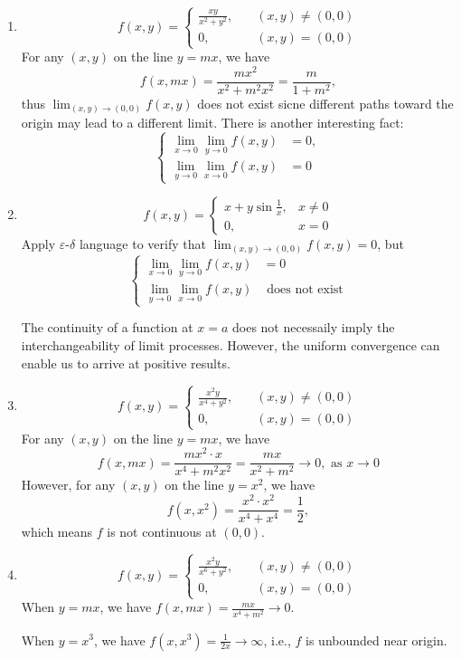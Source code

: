 \begin{example}
\begin{enumerate}
\item
\[
f(x,y)=\left\{
\begin{aligned}
\frac{xy}{x^2+y^2},&\quad (x,y)\ne(0,0)\\
0,&\quad (x,y)=(0,0)
\end{aligned}
\right.
\]
For any $(x,y)$ on the line $y=mx$, we have
\[
f(x,mx)=\frac{mx^2}{x^2+m^2x^2}=\frac{m}{1+m^2},
\]
thus $\lim_{(x,y)\to(0,0)}f(x,y)$ does not exist sicne different paths toward the origin may lead to a different limit. There is another interesting fact:
\[
\left\{
\begin{aligned}
\lim_{x\to0}\lim_{y\to0}f(x,y)&=0,\\
\lim_{y\to0}\lim_{x\to0}f(x,y)&=0
\end{aligned}
\right.
\]
\item
\[
f(x,y)=\left\{
\begin{aligned}
x+y\sin\frac{1}{x},&x\ne0\\
0,&x=0
\end{aligned}
\right.
\]
Apply $\varepsilon$-$\delta$ language to verify that $\lim_{(x,y)\to(0,0)}f(x,y)=0$, but
\[
\left\{
\begin{aligned}
\lim_{x\to0}\lim_{y\to0}f(x,y)&=0\\
\lim_{y\to0}\lim_{x\to0}f(x,y)&\mbox{ does not exist}
\end{aligned}
\right.
\]
\begin{remark}
The continuity of a function at $x=a$ does not necessaily imply the interchangeability of limit processes. However, the uniform convergence can enable us to arrive at positive results.
\end{remark}

\item
\[
f(x,y)=\left\{
\begin{aligned}
\frac{x^2y}{x^4+y^2},&\quad (x,y)\ne(0,0)\\
0,&\quad (x,y)=(0,0)
\end{aligned}
\right.
\]
For any $(x,y)$ on the line $y=mx$, we have
\[
f(x,mx)=\frac{mx^2\cdot x}{x^4+m^2x^2}=\frac{mx}{x^2+m^2}\to0,\mbox{ as }x\to0
\]
However, for any $(x,y)$ on the line $y=x^2$, we have
\[
f(x,x^2)=\frac{x^2\cdot x^2}{x^4+x^4}=\frac{1}{2},
\]
which means $f$ is not continuous at $(0,0)$.
\item
\[
f(x,y)=\left\{
\begin{aligned}
\frac{x^2y}{x^6+y^2},&\quad (x,y)\ne(0,0)\\
0,&\quad (x,y)=(0,0)
\end{aligned}
\right.
\]
When $y=mx$, we have $f(x,mx)=\frac{mx}{x^4+m^2}\to0$.

When $y=x^3$, we have $f(x,x^3)=\frac{1}{2x}\to\infty$, i.e., $f$ is unbounded near origin.
\end{enumerate}
\end{example}

